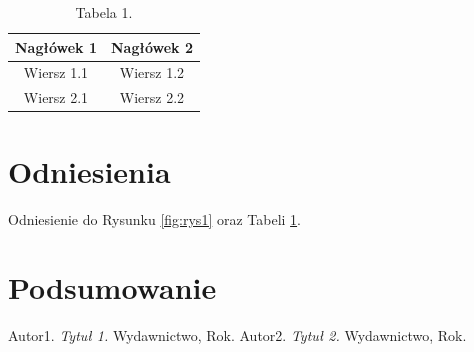 \documentclass{article}
\begin{document}
    \lipsum[4]

    \begin{table}[h]
        \centering
        \begin{tabular}{|c|c|}
            \hline
            Nagłówek 1 & Nagłówek 2 \\
            \hline
            Wiersz 1.1 & Wiersz 1.2 \\
            Wiersz 2.1 & Wiersz 2.2 \\
            \hline
        \end{tabular}
        \caption{Tabela 1.}
        \label{tab:tabela1}
    \end{table}

\section{Odniesienia}
    Odniesienie do Rysunku \ref{fig:rys1} oraz Tabeli \ref{tab:tabela1}.

\section{Podsumowanie}
    \lipsum[5]

\begin{thebibliography}{99}
     Autor1. \emph{Tytuł 1.} Wydawnictwo, Rok.
     Autor2. \emph{Tytuł 2.} Wydawnictwo, Rok.
\end{thebibliography}
\end{document}
